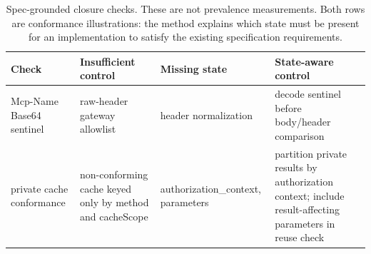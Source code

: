 \begin{table}[t]
  \caption{Spec-grounded closure checks. These are not prevalence
  measurements. Both rows are conformance illustrations: the method explains
  which state must be present for an implementation to satisfy the existing
  specification requirements.}
  \label{tab:spec-closure}
  \centering\footnotesize
  \begin{tabular}{@{}p{}p{}p{}p{}@{}}
    \toprule
    Check & Insufficient control & Missing state & State-aware control \\
    \midrule
    Mcp-Name Base64 sentinel & raw-header gateway allowlist & header normalization & decode sentinel before body/header comparison \\
    private cache conformance & non-conforming cache keyed only by method and cacheScope & authorization\_context, parameters & partition private results by authorization context; include result-affecting parameters in reuse check \\
    \bottomrule
  \end{tabular}
\end{table}
